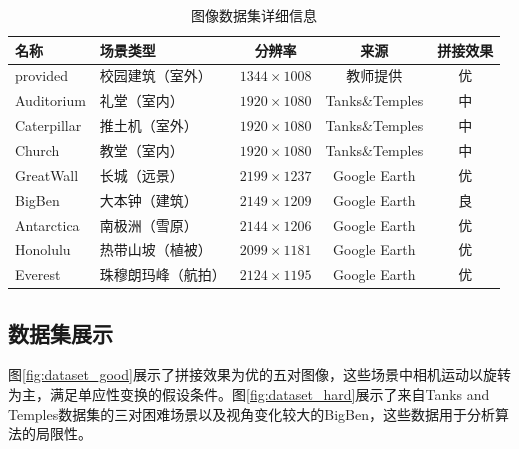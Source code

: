 \documentclass[12pt]{article}
\begin{document}
\begin{table}[H]
\centering
\caption{图像数据集详细信息}
\label{tab:dataset}
\begin{tabular}{llccc}
\toprule
\textbf{名称} & \textbf{场景类型} & \textbf{分辨率} & \textbf{来源} & \textbf{拼接效果} \\
\midrule
provided & 校园建筑（室外） & $1344\times1008$ & 教师提供 & 优 \\
Auditorium & 礼堂（室内） & $1920\times1080$ & Tanks\&Temples & 中 \\
Caterpillar & 推土机（室外） & $1920\times1080$ & Tanks\&Temples & 中 \\
Church & 教堂（室内） & $1920\times1080$ & Tanks\&Temples & 中 \\
GreatWall & 长城（远景） & $2199\times1237$ & Google Earth & 优 \\
BigBen & 大本钟（建筑） & $2149\times1209$ & Google Earth & 良 \\
Antarctica & 南极洲（雪原） & $2144\times1206$ & Google Earth & 优 \\
Honolulu & 热带山坡（植被） & $2099\times1181$ & Google Earth & 优 \\
Everest & 珠穆朗玛峰（航拍） & $2124\times1195$ & Google Earth & 优 \\
\bottomrule
\end{tabular}
\end{table}

\subsection{数据集展示}

图\ref{fig:dataset_good}展示了拼接效果为优的五对图像，这些场景中相机运动以旋转为主，满足单应性变换的假设条件。图\ref{fig:dataset_hard}展示了来自Tanks and Temples数据集的三对困难场景以及视角变化较大的BigBen，这些数据用于分析算法的局限性。
\end{document}
